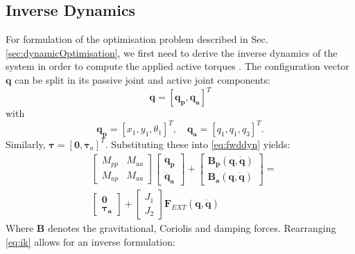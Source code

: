 \documentclass[letterpaper, 10 pt, conference]{ieeeconf}  %
\begin{document}
\subsection{Inverse Dynamics}
For formulation of the optimisation problem described in Sec. \ref{sec:dynamicOptimisation}, we first need to derive the inverse dynamics of the system in order to compute the applied active torques \cite{nakanishi2007inverse}. The configuration vector $\mathbf{q}$ can be split in its passive joint and active joint components:
 \begin{equation}
\mathbf{q} = \left[\mathbf{q_p}, \mathbf{q_a}\right]^T
\end{equation}
with
 \begin{equation}
\mathbf{q_p} = [x_1,y_1,\theta_1]^T, \quad  
\mathbf{q_a} = [q_1,q_1,q_3]^T.
\end{equation}
\noindent
Similarly, $\boldsymbol{\tau} = \left[\mathbf{0},\boldsymbol{\tau}_a\right]^T$.
Substituting these into \eqref{eq:fwddyn} yields:
\begin{equation}
\begin{aligned}
&\left[\begin{array}{cc}  
M_{pp} & M_{aa}\\
M_{ap} & M_{aa}
\end{array} \right]
\left[\begin{array}{c}  
\mathbf{\ddot q_p}\\
\mathbf{\ddot q_a}
\end{array} \right] +
\left[\begin{array}{c}  
\mathbf{B_p (q,\dot q)}\\
\mathbf{B_a (q,\dot q)}
\end{array} \right] 
=\\
&\left[\begin{array}{c}  
\mathbf{0}\\
\boldsymbol{\tau_a}
\end{array} \right] 
+
\left[\begin{array}{c}  
J_1\\
J_2
\end{array} \right] 
\mathbf{F}_{EXT}\mathbf{(q, \dot q)}
\end{aligned} \label{eq:ik}
\end{equation}		
Where $\mathbf{B}$ denotes the gravitational, Coriolis and damping forces. 
Rearranging \eqref{eq:ik} allows for an inverse formulation:
\end{document}
